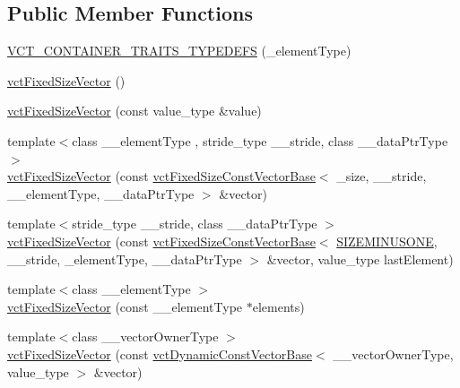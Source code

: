 \subsection*{Public Member Functions}
\begin{DoxyCompactItemize}
\item 
\hyperlink{classvct_fixed_size_vector_a418a683fb9eb410416a48ef6c21cd34f}{V\-C\-T\-\_\-\-C\-O\-N\-T\-A\-I\-N\-E\-R\-\_\-\-T\-R\-A\-I\-T\-S\-\_\-\-T\-Y\-P\-E\-D\-E\-F\-S} (\-\_\-element\-Type)
\item 
\hyperlink{classvct_fixed_size_vector_a77fbc89a1103f7a2ece1b66cc7fa59cf}{vct\-Fixed\-Size\-Vector} ()
\item 
\hyperlink{classvct_fixed_size_vector_a9ccee474c1ccae6fb6c03659948e26c0}{vct\-Fixed\-Size\-Vector} (const value\-\_\-type \&value)
\item 
{\footnotesize template$<$class \-\_\-\-\_\-element\-Type , stride\-\_\-type \-\_\-\-\_\-stride, class \-\_\-\-\_\-data\-Ptr\-Type $>$ }\\\hyperlink{classvct_fixed_size_vector_a2a06cdd6e30d5abca3391139cdb1846a}{vct\-Fixed\-Size\-Vector} (const \hyperlink{classvct_fixed_size_const_vector_base}{vct\-Fixed\-Size\-Const\-Vector\-Base}$<$ \-\_\-size, \-\_\-\-\_\-stride, \-\_\-\-\_\-element\-Type, \-\_\-\-\_\-data\-Ptr\-Type $>$ \&vector)
\item 
{\footnotesize template$<$stride\-\_\-type \-\_\-\-\_\-stride, class \-\_\-\-\_\-data\-Ptr\-Type $>$ }\\\hyperlink{classvct_fixed_size_vector_a11370c6a730334a10d140992d207c057}{vct\-Fixed\-Size\-Vector} (const \hyperlink{classvct_fixed_size_const_vector_base}{vct\-Fixed\-Size\-Const\-Vector\-Base}$<$ \hyperlink{classvct_fixed_size_vector_ae684c096a8e0682238147d0cbc182cdeaa60fa332debc82a5c232c3330c14f4fd}{S\-I\-Z\-E\-M\-I\-N\-U\-S\-O\-N\-E}, \-\_\-\-\_\-stride, \-\_\-element\-Type, \-\_\-\-\_\-data\-Ptr\-Type $>$ \&vector, value\-\_\-type last\-Element)
\item 
{\footnotesize template$<$class \-\_\-\-\_\-element\-Type $>$ }\\\hyperlink{classvct_fixed_size_vector_a33324f9254a1b465cf66aeca6c4cb18b}{vct\-Fixed\-Size\-Vector} (const \-\_\-\-\_\-element\-Type $\ast$elements)
\item 
{\footnotesize template$<$class \-\_\-\-\_\-vector\-Owner\-Type $>$ }\\\hyperlink{classvct_fixed_size_vector_ac4ea45620ddcaa7df30f806e8a3ba26f}{vct\-Fixed\-Size\-Vector} (const \hyperlink{classvct_dynamic_const_vector_base}{vct\-Dynamic\-Const\-Vector\-Base}$<$ \-\_\-\-\_\-vector\-Owner\-Type, value\-\_\-type $>$ \&vector)

\end{DoxyCompactItemize}
